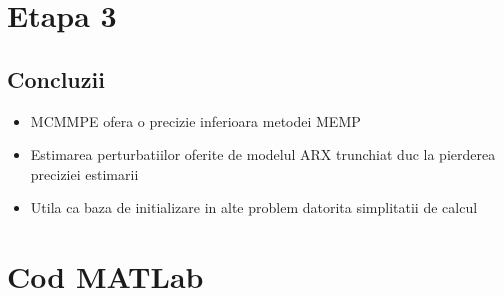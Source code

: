 \documentclass[12pt,english]{article}
\begin{document}
\section {Etapa 3}




\newpage

\subsection {Concluzii}
\begin{itemize}
  \item MCMMPE ofera o precizie inferioara metodei MEMP
  \item Estimarea perturbatiilor oferite de modelul ARX trunchiat duc la pierderea preciziei estimarii
  \item Utila ca baza de initializare in alte problem datorita simplitatii de calcul
\end{itemize}

\section{Cod MATLab}
% 
\end{document}
